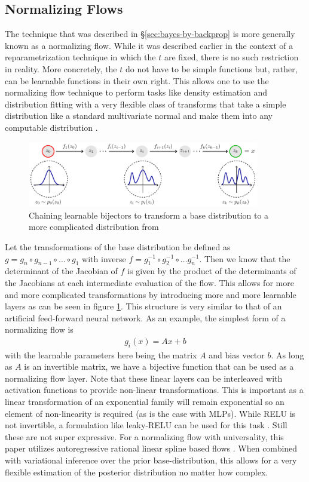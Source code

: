\subsection{Normalizing Flows}
\label{sec:normalizing-flows}
The technique that was described in \S\ref{sec:bayes-by-backprop} is more generally known as a normalizing flow. While it was described earlier in the context of a reparametrization technique in which the $t$ are fixed, there is no such restriction in reality. More concretely, the $t$ do not have to be simple functions but, rather, can be learnable functions in their own right. This allows one to use the normalizing flow technique to perform tasks like density estimation and distribution fitting with a very flexible class of transforms that take a simple distribution like a standard multivariate normal and make them into any computable distribution \cite{kobyzev_normalizing_2021}.
\begin{figure}[t]
  \centering
  \includegraphics[width=0.9\textwidth]{images/nf.pdf}
  \caption{Chaining learnable bijectors to transform a base distribution to a more complicated distribution from \cite{weng_flow-based_2018}}
  \label{fig:nf}
\end{figure}
Let the transformations of the base distribution be defined as $g = g_n \circ g_{n-1} \circ \dots \circ g_1$ with inverse $f = g_1^{-1} \circ g_2^{-1} \circ \dots g_n^{-1}$. Then we know that the determinant of the Jacobian of $f$ is given by the product of the determinants of the Jacobians at each intermediate evaluation of the flow. This allows for more and more complicated transformations by introducing more and more learnable layers as can be seen in figure \ref{fig:nf}. This structure is very similar to that of an artificial feed-forward neural network. As an example, the simplest form of a normalizing flow is
\begin{align*}
  g_i(x) = Ax + b
\end{align*}
with the learnable parameters here being the matrix $A$ and bias vector $b$. As long as $A$ is an invertible matrix, we have a bijective function that can be used as a normalizing flow layer. Note that these linear layers can be interleaved with activation functions to provide non-linear transformations. This is important as a linear transformation of an exponential family will remain exponential so an element of non-linearity is required (as is the case with MLPs). While RELU is not invertible, a formulation like leaky-RELU can be used for this task \cite{xu_empirical_2015}. Still these are not super expressive. For a normalizing flow with universality, this paper utilizes autoregressive rational linear spline based flows \cite{durkan_neural_2019}. When combined with variational inference over the prior base-distribution, this allows for a very flexible estimation of the posterior distribution no matter how complex.
\newpage

